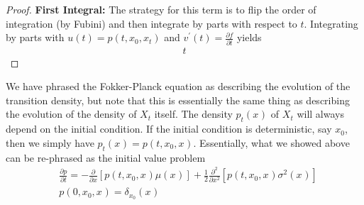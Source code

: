 \documentclass[12pt]{article}
\newcommand{\state}[1][t]{X_{#1}}
\newcommand{\stateValue}[1][t]{x_{#1}}
\begin{document}
\begin{proof}
\bigskip
\noindent
\textbf{First Integral:} The strategy for this term is to flip the order of integration (by Fubini) and then integrate by parts with respect to $t$. 
Integrating by parts with $u(t) = p(t, \stateValue[0], \stateValue)$ and $v^\prime(t) = \frac{\partial f}{\partial t}$ yields 
\begin{align*}
t
\end{align*}

\end{proof}

We have phrased the Fokker-Planck equation as describing the evolution of the transition density, but note that this is essentially the same thing as 
describing the evolution of the density of $\state$ itself. The density $p_t(\stateValue[])$ of $\state$ will always depend on the initial condition. If the initial condition is 
deterministic, say $\stateValue[0]$, then we simply have $p_t(\stateValue[]) = p(t, \stateValue[0], \stateValue[])$. Essentially, what we showed above can be re-phrased
as the initial value problem
\begin{align}
&\frac{\partial p}{\partial t} = -\frac{\partial}{\partial x} [p(t, \stateValue[0], \stateValue[])\mu(\stateValue[])] + \frac{1}{2} \frac{\partial^2}{\partial x^2} [p(t, \stateValue[0], \stateValue[]) \sigma^2(\stateValue[])] \\
&p(0, \stateValue[0], \stateValue[]) = \delta_{\stateValue[0]}(\stateValue[]) \nonumber
\end{align}
\end{document}
